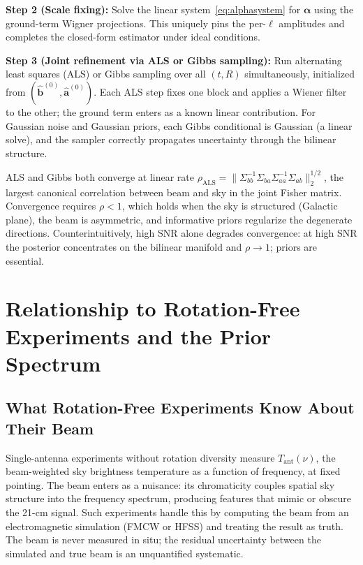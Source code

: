 \documentclass{aastex631}
\theoremstyle{plain}
\theoremstyle{remark}
\begin{document}
\textbf{Step 2 (Scale fixing):}
Solve the linear system~\ref{eq:alphasystem} for
$\boldsymbol{\alpha}$ using the ground-term Wigner projections.
This uniquely pins the per-$\ell$ amplitudes and completes the
closed-form estimator under ideal conditions.

\textbf{Step 3 (Joint refinement via ALS or Gibbs sampling):}
Run alternating least squares (ALS) or Gibbs sampling over all
$(t, R)$ simultaneously, initialized from $(\hat{\mathbf{b}}^{(0)},
\hat{\mathbf{a}}^{(0)})$.
Each ALS step fixes one block and applies a Wiener filter to the
other; the ground term enters as a known linear contribution.
For Gaussian noise and Gaussian priors, each Gibbs conditional is
Gaussian (a linear solve), and the sampler correctly propagates
uncertainty through the bilinear structure.

ALS and Gibbs both converge at linear rate $\rho_\mathrm{ALS} =
\|\Sigma_{bb}^{-1}\Sigma_{ba}\Sigma_{aa}^{-1}\Sigma_{ab}\|_2^{1/2}$,
the largest canonical correlation between beam and sky in the joint
Fisher matrix.
Convergence requires $\rho < 1$, which holds when the sky is
structured (Galactic plane), the beam is asymmetric, and informative
priors regularize the degenerate directions.
Counterintuitively, high SNR alone degrades convergence:
at high SNR the posterior concentrates on the bilinear manifold and
$\rho \to 1$; priors are essential.

\section{Relationship to Rotation-Free Experiments and the Prior Spectrum}
\label{sec:edges}

\subsection{What Rotation-Free Experiments Know About Their Beam}

Single-antenna experiments without rotation diversity measure
$T_\mathrm{ant}(\nu)$, the beam-weighted sky brightness temperature
as a function of frequency, at fixed pointing.
The beam enters as a nuisance: its chromaticity couples spatial sky
structure into the frequency spectrum, producing features that
mimic or obscure the 21-cm signal.
Such experiments handle this by computing the beam from an
electromagnetic simulation (FMCW or HFSS) and treating the result
as truth.
The beam is never measured in situ; the residual uncertainty between
the simulated and true beam is an unquantified systematic.
\end{document}
